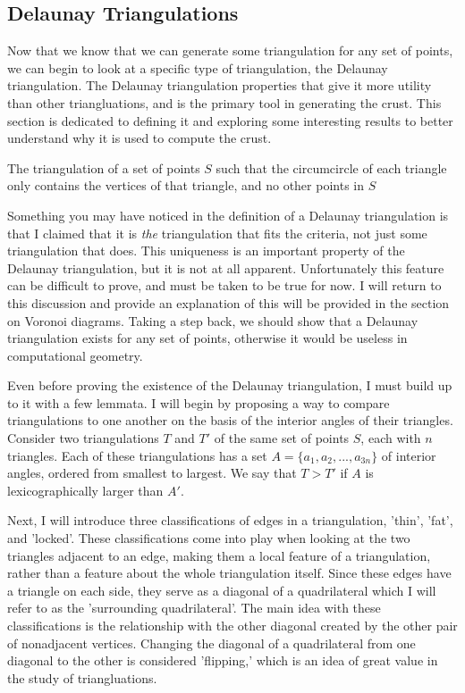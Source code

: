 \subsection{Delaunay Triangulations}
Now that we know that we can generate some triangulation for any set of points, we can begin to look at a specific type of triangulation, the Delaunay triangulation.
The Delaunay triangulation properties that give it more utility than other triangluations, and is the primary tool in generating the crust.
This section is dedicated to defining it and exploring some interesting results to better understand why it is used to compute the crust.

\begin{definition}
	The triangulation of a set of points $S$ such that the circumcircle of each triangle only contains the vertices of that triangle, and no other points in $S$
\end{definition}



Something you may have noticed in the definition of a Delaunay triangulation is that I claimed that it is \textit{the} triangulation that fits the criteria, not just some triangulation that does.
This uniqueness is an important property of the Delaunay triangulation, but it is not at all apparent.
Unfortunately this feature can be difficult to prove, and must be taken to be true for now.
I will return to this discussion and provide an explanation of this will be provided in the section on Voronoi diagrams.
Taking a step back, we should show that a Delaunay triangulation exists for any set of points, otherwise it would be useless in computational geometry.

Even before proving the existence of the Delaunay triangulation, I must build up to it with a few lemmata.
I will begin by proposing a way to compare triangulations to one another on the basis of the interior angles of their triangles.
Consider two triangulations $T$ and $T'$ of the same set of points $S$, each with $n$ triangles.
Each of these triangulations has a set $A=\{a_1, a_2, ..., a_{3n}\}$ of interior angles, ordered from smallest to largest.
We say that $T>T'$ if $A$ is lexicographically larger than $A'$.

Next, I will introduce three classifications of edges in a triangulation, 'thin', 'fat', and 'locked'.
These classifications come into play when looking at the two triangles adjacent to an edge, making them a local feature of a triangulation, rather than a feature about the whole triangulation itself.
Since these edges have a triangle on each side, they serve as a diagonal of a quadrilateral which I will refer to as the 'surrounding quadrilateral'.
The main idea with these classifications is the relationship with the other diagonal created by the other pair of nonadjacent vertices.
Changing the diagonal of a quadrilateral from one diagonal to the other is considered 'flipping,' which is an idea of great value in the study of triangluations.


